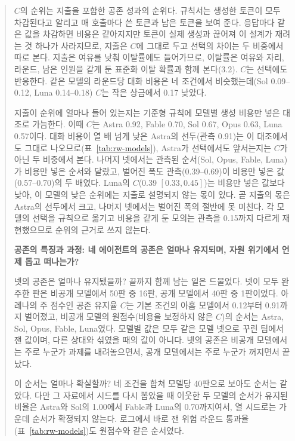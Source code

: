 \begin{quote}
{\color{black}$C$의 순위는 지출을 포함한 공존 성과의 순위다. 규칙서는 생성한 토큰이 모두 차감된다고 알리고 매 호출마다 쓴 토큰과 남은 토큰을 보여 준다. 응답마다 같은 값을 차감하면 비용은 같아지지만 토큰이 실제 생성과 끊어져 이 설계가 재려는 것 하나가 사라지므로, 지출은 $C$에 그대로 두고 선택의 차이는 두 비중에서 따로 본다. 지출은 여유를 낮춰 이탈률에도 들어가므로, 이탈률은 여유와 자리, 라운드, 남은 인원을 같게 둔 표준화 이탈 확률과 함께 본다(3.2). $C$는 선택에도 반응한다. 같은 모델의 라운드당 대화 비용은 네 조건에서 비슷했는데(Sol 0.09--0.12, Luna 0.14--0.18) $C$는 작은 상금에서 0.17 낮았다.}

{\color{black}지출이 순위에 얼마나 들어 있는지는 기준형 규칙에 모델별 생성 비용만 넣은 대조로 가늠한다. 이때 $C$는 Astra 0.92, Fable 0.70, Sol 0.67, Opus 0.63, Luna 0.57이다. 대화 비용이 열 배 넘게 낮은 Astra의 선두(관측 0.91)는 이 대조에서도 그대로 나오므로(표~\ref{tab:rw-models}), Astra가 선택에서도 앞서는지는 $C$가 아닌 두 비중에서 본다. 나머지 넷에서는 관측된 순서(Sol, Opus, Fable, Luna)가 비용만 넣은 순서와 달랐고, 벌어진 폭도 관측(0.39--0.69)이 비용만 넣은 값(0.57--0.70)의 두 배였다. Luna의 $C$(0.39 $[0.33,0.45]$)는 비용만 넣은 값보다 낮아, 이 모델의 낮은 순위에는 지출로 설명되지 않는 몫이 있다. 곧 지출의 몫은 Astra의 선두에서 크고, 나머지 넷에서는 벌어진 폭의 절반에 못 미친다. 각 모델의 선택을 규칙으로 옮기고 비용을 같게 둔 모의는 관측을 0.15까지 다르게 재현했으므로 순위의 근거로 쓰지 않는다.}

\par\medskip\noindent\textbf{공존의 특징과 과정: 네 에이전트의 공존은 얼마나 유지되며, 자원 위기에서 언제 돕고 떠나는가?}\par

{\color{black}넷의 공존은 얼마나 유지됐을까? 끝까지 함께 남는 일은 드물었다. 넷이 모두 완주한 판은 비공개 모델에서 50판 중 16판, 공개 모델에서 40판 중 1판이었다. 아레나의 주 점수인 공존 유지율 $C$는 기본 조건의 아홉 모델에서 0.12부터 0.91까지 벌어졌고, 비공개 모델의 원점수(비용을 보정하지 않은 $C$)의 순서는 Astra, Sol, Opus, Fable, Luna였다. 모델별 값은 모두 같은 모델 넷으로 꾸린 팀에서 잰 값이며, 다른 상대와 섞였을 때의 값이 아니다. 넷의 공존은 비공개 모델에서는 주로 누군가 과제를 내려놓으면서, 공개 모델에서는 주로 누군가 꺼지면서 끝났다.}



{\color{black}이 순서는 얼마나 확실할까? 네 조건을 합쳐 모델당 40판으로 보아도 순서는 같았다. 다만 그 자료에서 시드를 다시 뽑았을 때 이웃한 두 모델의 순서가 유지된 비율은 Astra와 Sol의 1.00에서 Fable과 Luna의 0.70까지여서, 열 시드로는 가운데 순서가 확정되지 않는다. 로그에서 바로 잰 위험 라운드 통과율(표~\ref{tab:rw-models})도 원점수와 같은 순서였다.}


\end{quote}

